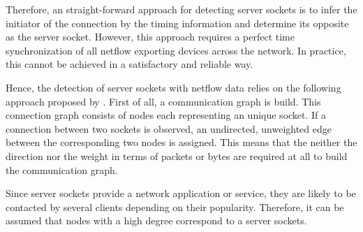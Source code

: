 Therefore, an straight-forward approach for detecting server sockets is to infer the initiator of the connection by the timing information and determine its opposite as the server socket. However, this approach requires a perfect time synchronization of all netflow exporting devices across the network. In practice, this cannot be achieved in a satisfactory and reliable way.


Hence, the detection of server sockets with netflow data relies on the following approach proposed by \citet{Schatzmann:Mining,Schatzmann:Dissection, Schatzmann:Tracing}. First of all, a communication graph is build. This connection graph consists of nodes each representing an unique socket. If a connection between two sockets is observed, an undirected, unweighted edge between the corresponding two nodes is assigned. This means that the neither the direction nor the weight in terms of packets or bytes are required at all to build the communication graph. 

Since server sockets provide a network application or service, they are likely to be contacted by several clients depending on their popularity. Therefore, it can be assumed that nodes with a high degree correspond to a server sockets.





